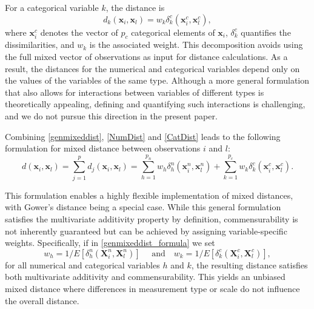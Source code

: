 \documentclass[12pt]{article}
\begin{document}
For a categorical variable $k$, the distance is
\begin{equation}\label{CatDist}
d_{k}(\mathbf{x}_i, \mathbf{x}_l) = w_{k} \delta_{k}^c(\mathbf{x}^c_{i}, \mathbf{x}^c_{l}),
\end{equation}
where $\mathbf{x}^c_{i}$ denotes the vector of $p_c$ categorical elements of $\mathbf{x}_{i}$, $\delta^c_{k}$ quantifies the dissimilarities, and $w_{k}$ is the associated weight. This decomposition avoids using the full mixed vector of observations as input for distance calculations. As a result, the distances for the numerical and categorical variables depend only on the values of the variables of the same type. Although a more general formulation that also allows for interactions between variables of different types is theoretically appealing, defining and quantifying such interactions is challenging, and we do not pursue this direction in the present paper.

Combining \eqref{genmixeddist}, \eqref{NumDist} and \eqref{CatDist} leads to the following formulation for mixed distance between observations $i$ and $l$:
\begin{equation}\label{genmixeddist_formula}
    d(\mathbf{x}_i,\mathbf{x}_l)=\sum_{j=1}^{p} d_j(\mathbf{x}_i, \mathbf{x}_l)
    =\sum_{h=1}^{p_n} w_{h} \delta^n_{h}(\mathbf{x}^n_i,\mathbf{x}^n_l)+ \sum_{k=1}^{p_c} w_{k}\delta^c_{k}(\mathbf{x}^c_i,\mathbf{x}^c_l).
\end{equation}

This formulation enables a highly flexible implementation of mixed distances, with Gower’s distance being a special case. While this general formulation satisfies the multivariate additivity property by definition, commensurability is not inherently guaranteed but can be achieved by assigning variable-specific weights. Specifically, if in \eqref{genmixeddist_formula} we set
\begin{equation}\label{commensurableweights}
w_{h} = 1/E[\delta^{n}_{h}(\bm{X}^{n}_i, \bm{X}^{n}_l)]\quad \text{ and} \quad w_{k} = 1/E[\delta^{c}_{k}(\bm{X}^{c}_i, \bm{X}^{c}_l)],
\end{equation}
for all numerical and categorical variables $h$ and $k$, the resulting distance satisfies both multivariate additivity and commensurability. This yields an unbiased mixed distance where differences in measurement type or scale do not influence the overall distance.
\end{document}
